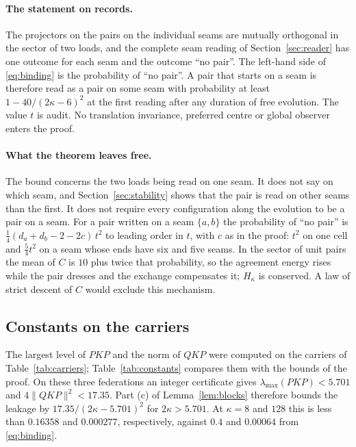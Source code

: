 \documentclass[11pt]{article}
\theoremstyle{definition}
\theoremstyle{remark}
\theoremstyle{plain}
\begin{document}
\paragraph{The statement on records.}
The projectors on the pairs on the individual seams are mutually orthogonal
in the sector of two loads, and the complete seam reading of
Section~\ref{sec:reader} has one outcome for each seam and the outcome ``no
pair''. The left-hand side of \eqref{eq:binding} is the probability of ``no
pair''. A pair that starts on a seam is therefore read as a pair on some
seam with probability at least $1-40/(2\kappa-6)^2$ at the first reading
after any duration of free evolution. The
value $t$ is audit. No translation invariance, preferred centre or global
observer enters the proof.

\paragraph{What the theorem leaves free.}
The bound concerns the two loads being read on one seam. It does not say on
which seam, and Section~\ref{sec:stability} shows that the pair is read on
other seams than the first. It does not require every configuration along
the evolution to be a pair on a seam. For a pair written on a seam
$\{a,b\}$ the probability of ``no pair'' is
$\tfrac14(d_a+d_b-2-2c)\,t^{2}$ to leading order in $t$, with $c$ as in
the proof: $t^{2}$ on one cell and $\tfrac54t^{2}$ on a seam whose ends
have six and five seams. In the sector of unit pairs the mean of $C$ is
$10$ plus twice that probability, so the agreement energy rises while the
pair dresses and the exchange compensates it; $H_\kappa$ is conserved. A
law of strict descent of $C$ would exclude this mechanism.

\subsection{Constants on the carriers}

The largest level of $PKP$ and the norm of $QKP$ were computed on the
carriers of Table~\ref{tab:carriers}; Table~\ref{tab:constants} compares
them with the bounds of the proof. On these three federations an integer certificate gives
$\lambda_{\max}(PKP)<5.701$ and $4\lVert QKP\rVert^2<17.35$.
Part (c) of Lemma~\ref{lem:blocks} therefore bounds the leakage by
$17.35/(2\kappa-5.701)^2$ for $2\kappa>5.701$. At $\kappa=8$ and
$128$ this is less than $0.16358$ and $0.000277$, respectively, against
$0.4$ and $0.00064$ from \eqref{eq:binding}.
\end{document}

